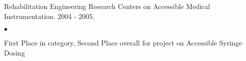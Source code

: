 \documentclass[margin,line]{res}
\newenvironment{list2}{
  \begin{list}{$\bullet$}{%
      \setlength{\itemsep}{0in}
      \setlength{\parsep}{0in} \setlength{\parskip}{0in}
      \setlength{\topsep}{0in} \setlength{\partopsep}{0in}
      \setlength{\leftmargin}{0.2in}}}{\end{list}}
\begin{document}
\begin{resume}
Rehabilitation Engineering Research Centers on Accessible Medical
Instrumentation. 2004 - 2005.
\begin{list2}
 \item First Place in category, Second Place overall for project on Accessible Syringe Dosing
\end{list2}
%





\end{resume}
\end{document}
